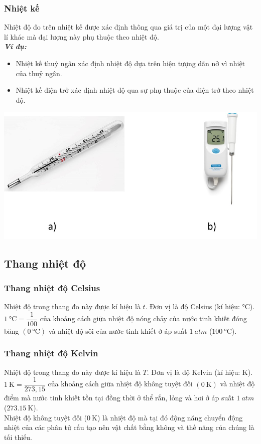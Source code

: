 \subsubsection{Nhiệt kế}
Nhiệt độ đo trên nhiệt kế được xác định thông qua giá trị của một đại lượng vật lí khác mà đại lượng này phụ thuộc theo nhiệt độ.\\
\textbf{\textit{Ví dụ:}}
\begin{itemize}
	\item Nhiệt kế thuỷ ngân xác định nhiệt độ dựa trên hiện tượng dãn nở vì nhiệt của thuỷ ngân.
	\item Nhiệt kế điện trở xác định nhiệt độ qua sự phụ thuộc của điện trở theo nhiệt độ.
\end{itemize}
\begin{center}
	\includegraphics[width=0.5\linewidth]{../figs/VN12-Y24-PH-SYL-002-2}
\end{center}
\subsection{Thang nhiệt độ}
\subsubsection{Thang nhiệt độ Celsius}
Nhiệt độ trong thang đo này được kí hiệu là $t$. Đơn vị là độ Celsius (kí hiệu: $\si{\celsius}$).\\
$\SI{1}{\celsius}=\dfrac{1}{100}$ của khoảng cách giữa nhiệt độ nóng chảy của nước tinh khiết đóng băng $\left(\SI{0}{\celsius}\right)$ và nhiệt độ sôi của nước tinh khiết ở áp suất $\SI{1}{atm}$ ($\SI{100}{\celsius}$).

\subsubsection{Thang nhiệt độ Kelvin}
Nhiệt độ trong thang đo này được kí hiệu là $T$. Đơn vị là độ Kelvin (kí hiệu: $\si{\kelvin}$).\\
$\SI{1}{\kelvin}=\dfrac{1}{273,15}$ của khoảng cách giữa nhiệt độ không tuyệt đối $\left(\SI{0}{\kelvin}\right)$ và nhiệt độ điểm mà nước tinh khiết tồn tại đồng thời ở thể rắn, lỏng và hơi ở áp suất $\SI{1}{atm}$ ($\SI{273.15}{\kelvin}$).\\
Nhiệt độ không tuyệt đối ($\SI{0}{\kelvin}$) là nhiệt độ mà tại đó động năng chuyển động nhiệt của các phân tử cấu tạo nên vật chất bằng không và thế năng của chúng là tối thiểu.
